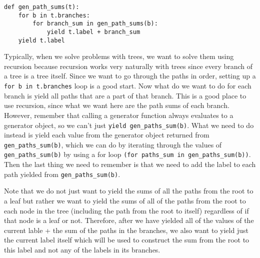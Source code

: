 \begin{blocksection}
\begin{solution}[0.5in]
\begin{lstlisting}
def gen_path_sums(t):
    for b in t.branches:
        for branch_sum in gen_path_sums(b):
            yield t.label + branch_sum
    yield t.label
\end{lstlisting}
Typically, when we solve problems with trees, we want to solve them using recursion because recursion works very naturally with trees since every branch of a tree is a tree itself.  Since we want to go through the paths in order, setting up a \lstinline{for b in t.branches} loop is a good start.  Now what do we want to do for each branch is yield all paths that are a part of that branch. This is a good place to use recursion, since what we want here are the path sums of each branch.  However, remember that calling a generator function always evaluates to a generator object, so we can’t just \lstinline{yield gen_paths_sum(b)}. What we need to do instead is yield each value from the generator object returned from \lstinline{gen_paths_sum(b)}, which we can do by iterating through the values of \lstinline{gen_paths_sum(b)} by using a for loop \lstinline{(for paths_sum in gen_paths_sum(b))}. Then the last thing we need to remember is that we need to add the label to each path yielded from \lstinline{gen_paths_sum(b)}. 

Note that we do not just want to yield the sums of all the paths from the root to a leaf but rather we want to yield the sums of all of the paths from the root to each node in the tree (including the path from the root to itself) regardless of if that node is a leaf or not. Therefore, after we have yielded all of the values of the current lable + the sum of the paths in the branches, we also want to yield just the current label itself which will be used to construct the sum from the root to this label and not any of the labels in its branches.
\end{solution}
\end{blocksection}
